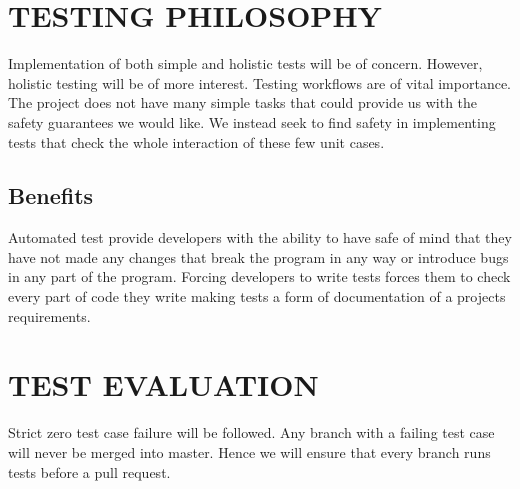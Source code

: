\documentclass[12pt]{article}
\begin{document}
  \section{TESTING PHILOSOPHY}
  Implementation of both simple and holistic tests will be of concern. However, holistic testing will be of more interest. Testing workflows are of vital importance. The project does not have many simple tasks that could provide us with the safety guarantees we would like. We instead seek to find safety in implementing tests that check the whole interaction of these few unit cases.
  
  \subsection{Benefits}
  Automated test provide developers with the ability to have safe of mind that they have not made any changes that break the program in any way or introduce bugs in any part of the program.
  Forcing developers to write tests forces them to check every part of code they write making tests a form of documentation of a projects requirements.
  
  \section{TEST EVALUATION}
  Strict zero test case failure will be followed. Any branch with a failing test case will never be merged into master. Hence we will ensure that every branch runs tests before a pull request.
  
\end{document}
